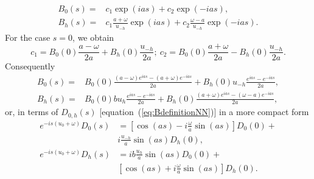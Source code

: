 \documentclass{iucr}
\newcommand{\inred}[1]{{\color{red}#1}}
\begin{document}
\begin{subequations}
\label{eq:BSolutions}
\begin{align}
B_0(s) = &c_1 \exp(i a s) + c_2 \exp(-i a s), \\
B_h(s) = &c_1 \frac{a+\omega}{u_{-h}} \exp(i a s) + c_2 
\frac{\omega-a}{u_{-h}} \exp(-i a s).
\end{align}
\end{subequations}
For the case $s=0$, we obtain
\begin{equation}
\label{eq:cs}
c_1=B_0(0) \frac{a-\omega}{2a}
+ B_h(0) \frac{u_{-h}}{2a};~ 
c_2=B_0(0)
\frac{a+\omega}{2a} - 
B_h(0) \frac{u_{-h}}{2a}. \nonumber
\end{equation}
Consequently
\begin{subequations}
\label{eq:preBSolutions}
\begin{align}
B_0(s) = &B_0(0) \frac{(a-\omega)e^{ias}-(a+\omega) e^{-ias}}{2a} +
B_h(0) u_{-h} \frac{e^{ias} - e^{-ias}}{2a}, \nonumber\\
B_h(s) = &B_0(0) b u_h 
\frac{e^{ias}-e^{-ias}}{2a}
+ B_h(0) 
\frac{(a+\omega) e^{ias}- (\omega-a) e^{-ias}}{2a}
, \nonumber
\end{align}
\end{subequations}
or, in terms of $D_{0,h}(s)$ [equation~(\ref{eq:BdefinitionNN})] in a more compact form
\begin{subequations}
\label{eq:DSolutionsCompact}
\begin{align}
e^{-is(u_0+\omega)} D_0(s) &=  [\cos(as) - i\frac{\omega}{a}\sin(as)] D_0(0) +  \nonumber \\
&i \frac{u_{-h}}{a}\sin(as) D_h(0), \\
e^{-is(u_0+\omega)} D_h(s) &= i b \frac{u_h}{a} \sin(as) D_0(0) + \nonumber \\ 
    &[\cos(as) + i \frac{\omega}{a} \sin(as)] D_h(0).
\end{align}
\end{subequations}

\end{document}
